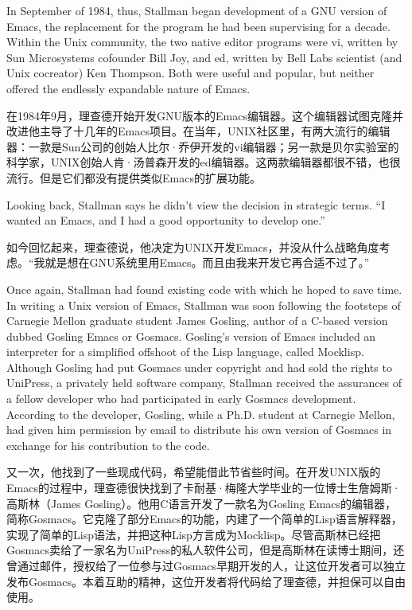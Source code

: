 \ifdefined\eng
In September of 1984, thus, Stallman began development of a GNU version of Emacs, the replacement for the program he had been supervising for a decade. Within the Unix community, the two native editor programs were vi, written by Sun Microsystems cofounder Bill Joy, and ed, written by Bell Labs scientist (and Unix cocreator) Ken Thompson. Both were useful and popular, but neither offered the endlessly expandable nature of Emacs.
\fi

\ifdefined\chs
在1984年9月，理查德开始开发GNU版本的Emacs编辑器。这个编辑器试图克隆并改进他主导了十几年的Emacs项目。在当年，UNIX社区里，有两大流行的编辑器：一款是Sun公司的创始人比尔·乔伊开发的vi编辑器；另一款是贝尔实验室的科学家，UNIX创始人肯·汤普森开发的ed编辑器。这两款编辑器都很不错，也很流行。但是它们都没有提供类似Emacs的扩展功能。
\fi

\ifdefined\eng
Looking back, Stallman says he didn't view the decision in strategic terms. ``I wanted an Emacs, and I had a good opportunity to develop one.''
\fi

\ifdefined\chs
如今回忆起来，理查德说，他决定为UNIX开发Emacs，并没从什么战略角度考虑。“我就是想在GNU系统里用Emacs。而且由我来开发它再合适不过了。”
\fi

\ifdefined\eng
Once again, Stallman had found existing code with which he hoped to save time. In writing a Unix version of Emacs, Stallman was soon following the footsteps of Carnegie Mellon graduate student James Gosling, author of a C-based version dubbed Gosling Emacs or Gosmacs. Gosling's version of Emacs included an interpreter for a simplified offshoot of the Lisp language, called Mocklisp. Although Gosling had put Gosmacs under copyright and had sold the rights to UniPress, a privately held software company, Stallman received the assurances of a fellow developer who had participated in early Gosmacs development. According to the developer, Gosling, while a Ph.D. student at Carnegie Mellon, had given him permission by email to distribute his own version of Gosmacs in exchange for his contribution to the code.
\fi

\ifdefined\chs
又一次，他找到了一些现成代码，希望能借此节省些时间。在开发UNIX版的Emacs的过程中，理查德很快找到了卡耐基·梅隆大学毕业的一位博士生詹姆斯·高斯林（James Gosling）。他用C语言开发了一款名为Gosling Emacs的编辑器，简称Gosmacs。它克隆了部分Emacs的功能，内建了一个简单的Lisp语言解释器，实现了简单的Lisp语法，并把这种Lisp方言成为Mocklisp。尽管高斯林已经把Gosmacs卖给了一家名为UniPress的私人软件公司，但是高斯林在读博士期间，还曾通过邮件，授权给了一位参与过Gosmacs早期开发的人，让这位开发者可以独立发布Gosmacs。本着互助的精神，这位开发者将代码给了理查德，并担保可以自由使用。
\fi

